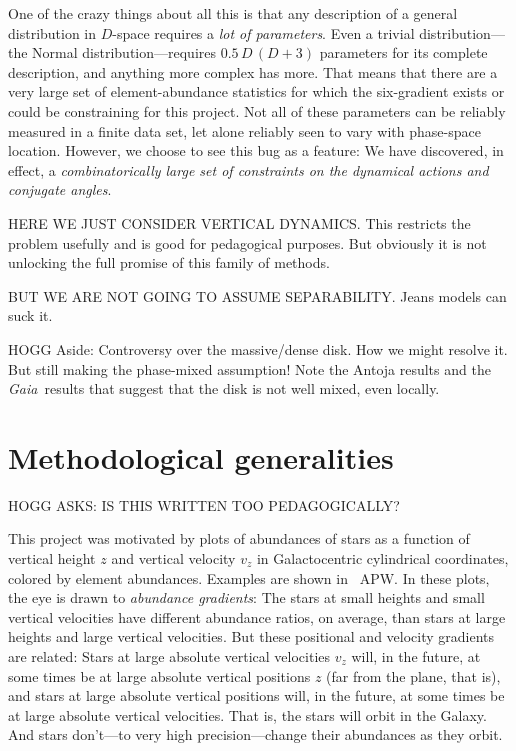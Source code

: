 \documentclass[modern]{aastex63}
\newcommand{\gaia}{\textsl{Gaia}}
\begin{document}
One of the crazy things about all this is that any description of a general distribution in $D$-space
requires a \emph{lot of parameters}.
Even a trivial distribution---the Normal distribution---requires $0.5\,D\,(D+3)$ parameters for its
complete description, and anything more complex has more.
That means that there are a very large set of element-abundance statistics for which the
six-gradient exists or could be constraining for this project.
Not all of these parameters can be reliably measured in a finite data set,
let alone reliably seen to vary with phase-space location.
However, we choose to see this bug as a feature:
We have discovered, in effect, a \emph{combinatorically large set of constraints on the
dynamical actions and conjugate angles}.

HERE WE JUST CONSIDER VERTICAL DYNAMICS.
This restricts the problem usefully and is good for pedagogical purposes.
But obviously it is not unlocking the full promise of this family of methods.

BUT WE ARE NOT GOING TO ASSUME SEPARABILITY.
Jeans models can suck it.

HOGG Aside: Controversy over the massive/dense disk. How we might resolve it.
But still making the phase-mixed assumption! Note the Antoja results and the \gaia\ results
that suggest that the disk is not well mixed, even locally.

\section{Methodological generalities}

HOGG ASKS: IS THIS WRITTEN TOO PEDAGOGICALLY?

This project was motivated by plots of abundances of stars as a
function of vertical height $z$ and vertical velocity $v_z$ in
Galactocentric cylindrical coordinates, colored by element abundances.
Examples are shown in \figurename~APW.
In these plots,
the eye is drawn to \emph{abundance gradients}: The stars at small
heights and small vertical velocities have different abundance ratios,
on average, than stars at large heights and large vertical velocities.
But these positional and velocity gradients are related:
Stars at large absolute vertical velocities $v_z$ will, in the future, at some
times be at large absolute vertical positions $z$ (far from the plane, that is),
and stars at large absolute vertical positions will, in the future,
at some times be at large absolute vertical velocities.
That is, the stars will orbit in the Galaxy.
And stars don't---to very high precision---change their abundances as
they orbit.
\end{document}
